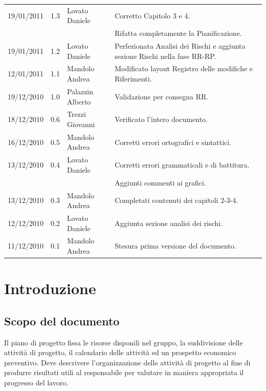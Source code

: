 \begin{longtable}{|p{}|c|p{}|p{}|}
\hline
19/01/2011 & 1.3 & Lovato Daniele & Corretto Capitolo 3 e 4.\\
&&&Rifatta completamente la Pianificazione.\\
\hline
19/01/2011 & 1.2 & Lovato Daniele & Perfezionata Analisi dei Rischi e aggiunta
sezione Rischi nella fase RR-RP.\\
\hline
12/01/2011 & 1.1 & Mandolo Andrea & Modificato layout Registro delle
modifiche e Riferimenti.\\
\hline
19/12/2010 & 1.0 & Palazzin Alberto & Validazione per consegna RR.\\
\hline
18/12/2010 & 0.6 & Trezzi Giovanni & Verificato l'intero documento.\\
\hline
16/12/2010 & 0.5 & Mandolo Andrea & Corretti errori ortografici e sintattici.\\
\hline
13/12/2010 & 0.4 & Lovato Daniele & Corretti errori grammaticali e di
battitura.\\
&&& Aggiunti commenti ai grafici.\\
\hline
13/12/2010 & 0.3 & Mandolo Andrea & Completati contenuti dei capitoli 2-3-4.\\
\hline
12/12/2010 & 0.2 & Lovato Daniele & Aggiunta sezione analisi dei rischi.\\
\hline
11/12/2010 & 0.1 & Mandolo Andrea & Stesura prima versione del documento.\\
\end{longtable}

\tableofcontents

\chapter{Introduzione}
\thispagestyle{fancy} %

\section{Scopo del documento}
Il piano di progetto fissa le risorse disponili nel gruppo, la suddivisione
delle attivit\`a di progetto, il calendario delle attivit\`a ed un prospetto
economico preventivo. Deve descrivere l'organizzazione delle attivit\`a di
progetto al fine di produrre risultati utili al responsabile per valutare in
maniera appropriata il progresso del lavoro.




